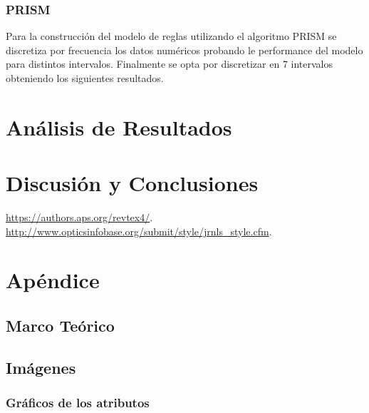 \documentclass[osajnl,twocolumn,showpacs,superscriptaddress,10pt,floatfix]{revtex4-1} %
\begin{document}
\twocolumngrid

\subsubsection{PRISM}

Para la construcción del modelo de reglas utilizando el algoritmo PRISM se discretiza por frecuencia los datos numéricos probando le performance del modelo para distintos intervalos. Finalmente se opta por discretizar en 7 intervalos obteniendo los siguientes resultados. \\

\section{Análisis de Resultados}

\section{Discusión y Conclusiones}

\begin{thebibliography}{99}

 \url{https://authors.aps.org/revtex4/}.
 \url{http://www.opticsinfobase.org/submit/style/jrnls_style.cfm}.

\end{thebibliography}

\clearpage

\onecolumngrid

\section{Apéndice} 

\subsection{Marco Teórico} \label{apendix:theory}

\subsection{Imágenes} \label{apendix:images}

\subsubsection{Gráficos de los atributos} \label{apendix:images:attr}
\end{document}
